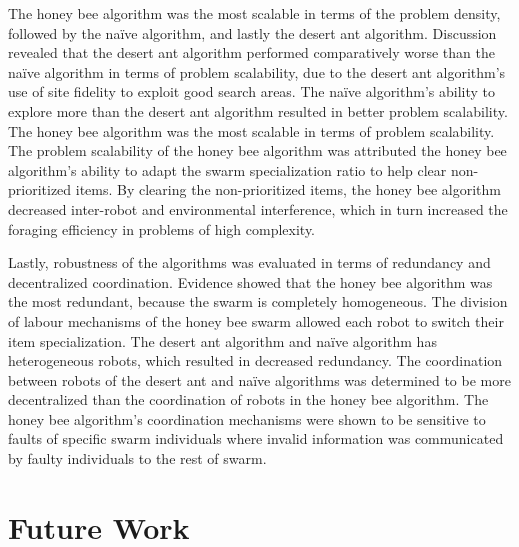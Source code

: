 The honey bee algorithm was the most scalable in terms of the problem density, followed by the na\"ive algorithm, and lastly the desert ant algorithm. Discussion revealed that the desert ant algorithm performed comparatively worse than the na\"ive algorithm in terms of problem scalability, due to the desert ant algorithm's use of site fidelity to exploit good search areas. The na\"ive algorithm's ability to explore more than the desert ant algorithm resulted in better problem scalability. The honey bee algorithm was the most scalable in terms of problem scalability. The problem scalability of the honey bee algorithm was attributed the honey bee algorithm's ability to adapt the swarm specialization ratio to help clear non-prioritized items. By clearing the non-prioritized items, the honey bee algorithm decreased inter-robot and environmental interference, which in turn increased the foraging efficiency in problems of high complexity.

Lastly, robustness of the algorithms was evaluated in terms of redundancy and decentralized coordination. Evidence showed that the honey bee algorithm was the most redundant, because the swarm is completely homogeneous. The division of labour mechanisms of the honey bee swarm allowed each robot to switch their item specialization. The desert ant algorithm and na\"ive algorithm has heterogeneous robots, which resulted in decreased redundancy. The coordination between robots of the desert ant and na\"ive algorithms was determined to be more decentralized than the coordination of robots in the honey bee algorithm. The honey bee algorithm's coordination mechanisms were shown to be sensitive to faults of specific swarm individuals where invalid information was communicated by faulty individuals to the rest of swarm.




\section{Future Work}
\label{sec:conclusions:future_work}




